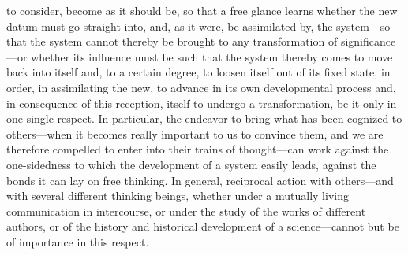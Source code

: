 \documentclass[12pt,a4paper]{book}
\begin{document}
to consider, become as it should be, so that a free glance learns whether the new datum
must go straight into, and, as it were, be assimilated by, the system---so that the system
cannot thereby be brought to any transformation of significance---or whether its influence
must be such that the system thereby comes to move back into itself and, to a certain
degree, to loosen itself out of its fixed state, in order, in assimilating the new, to
advance in its own developmental process and, in consequence of this reception, itself to
undergo a transformation, be it only in one single respect. In particular, the endeavor to
bring what has been cognized to others---when it becomes really important to us to convince
them, and we are therefore compelled to enter into their trains of thought---can work
against the one-sidedness to which the development of a system easily leads, against the
bonds it can lay on free thinking. In general, reciprocal action with others---and with
several different thinking beings, whether under a mutually living communication in
intercourse, or under the study of the works of different authors, or of the history and
historical development of a science---cannot but be of importance in this respect.
\end{document}
